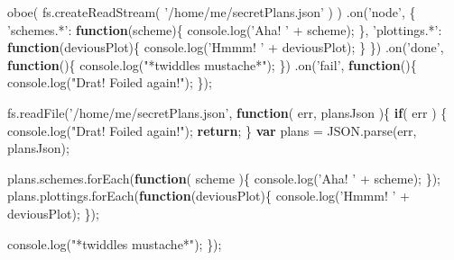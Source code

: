 \documentclass[]{article}
\newenvironment{Shaded}{}{}
\newcommand{\KeywordTok}[1]{\textcolor[rgb]{0.00,0.44,0.13}{\textbf{{#1}}}}
\newcommand{\StringTok}[1]{\textcolor[rgb]{0.25,0.44,0.63}{{#1}}}
\newcommand{\OtherTok}[1]{\textcolor[rgb]{0.00,0.44,0.13}{{#1}}}
\newcommand{\FunctionTok}[1]{\textcolor[rgb]{0.02,0.16,0.49}{{#1}}}
\newcommand{\NormalTok}[1]{{#1}}
\begin{document}
\begin{Shaded}
\begin{Highlighting}[]
\FunctionTok{oboe}\NormalTok{( }\OtherTok{fs}\NormalTok{.}\FunctionTok{createReadStream}\NormalTok{( }\StringTok{'/home/me/secretPlans.json'} \NormalTok{) )}
   \NormalTok{.}\FunctionTok{on}\NormalTok{(}\StringTok{'node'}\NormalTok{, \{}
      \StringTok{'schemes.*'}\NormalTok{: }\KeywordTok{function}\NormalTok{(scheme)\{}
         \OtherTok{console}\NormalTok{.}\FunctionTok{log}\NormalTok{(}\StringTok{'Aha! '} \NormalTok{+ scheme);}
      \NormalTok{\},}
      \StringTok{'plottings.*'}\NormalTok{: }\KeywordTok{function}\NormalTok{(deviousPlot)\{}
         \OtherTok{console}\NormalTok{.}\FunctionTok{log}\NormalTok{(}\StringTok{'Hmmm! '} \NormalTok{+ deviousPlot);}
      \NormalTok{\}   }
   \NormalTok{\})}
   \NormalTok{.}\FunctionTok{on}\NormalTok{(}\StringTok{'done'}\NormalTok{, }\KeywordTok{function}\NormalTok{()\{}
      \OtherTok{console}\NormalTok{.}\FunctionTok{log}\NormalTok{(}\StringTok{"*twiddles mustache*"}\NormalTok{);}
   \NormalTok{\})}
   \NormalTok{.}\FunctionTok{on}\NormalTok{(}\StringTok{'fail'}\NormalTok{, }\KeywordTok{function}\NormalTok{()\{}
      \OtherTok{console}\NormalTok{.}\FunctionTok{log}\NormalTok{(}\StringTok{"Drat! Foiled again!"}\NormalTok{);   }
   \NormalTok{\});}
\end{Highlighting}
\end{Shaded}

\begin{Shaded}
\begin{Highlighting}[]
\OtherTok{fs}\NormalTok{.}\FunctionTok{readFile}\NormalTok{(}\StringTok{'/home/me/secretPlans.json'}\NormalTok{, }\KeywordTok{function}\NormalTok{( err, plansJson )\{     }
   \KeywordTok{if}\NormalTok{( err ) \{}
      \OtherTok{console}\NormalTok{.}\FunctionTok{log}\NormalTok{(}\StringTok{"Drat! Foiled again!"}\NormalTok{);}
      \KeywordTok{return}\NormalTok{;}
   \NormalTok{\}}
   \KeywordTok{var} \NormalTok{plans = }\OtherTok{JSON}\NormalTok{.}\FunctionTok{parse}\NormalTok{(err, plansJson);}
   
   \OtherTok{plans}\NormalTok{.}\OtherTok{schemes}\NormalTok{.}\FunctionTok{forEach}\NormalTok{(}\KeywordTok{function}\NormalTok{( scheme )\{}
      \OtherTok{console}\NormalTok{.}\FunctionTok{log}\NormalTok{(}\StringTok{'Aha! '} \NormalTok{+ scheme);   }
   \NormalTok{\});   }
   \OtherTok{plans}\NormalTok{.}\OtherTok{plottings}\NormalTok{.}\FunctionTok{forEach}\NormalTok{(}\KeywordTok{function}\NormalTok{(deviousPlot)\{}
      \OtherTok{console}\NormalTok{.}\FunctionTok{log}\NormalTok{(}\StringTok{'Hmmm! '} \NormalTok{+ deviousPlot);}
   \NormalTok{\});}
      
   \OtherTok{console}\NormalTok{.}\FunctionTok{log}\NormalTok{(}\StringTok{"*twiddles mustache*"}\NormalTok{);   }
\NormalTok{\});}
\end{Highlighting}
\end{Shaded}
\end{document}
